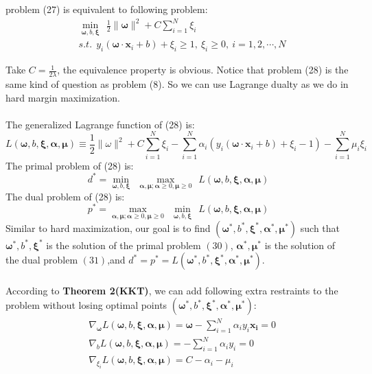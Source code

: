 \begin{theorem}
  problem (27) is equivalent to following problem:
  \begin{equation}
    \begin{split}
      &\min_{\bm\omega,b,\bm\xi}\ \ \frac{1}{2}\|\bm\omega\|^2+C\sum_{i=1}^{N}\xi_{i}\\
      &s.t.\ \ y_{i}(\bm\omega\cdot\bm x_{i}+b)+\xi_{i}\geqslant 1,\ \xi_{i}\geqslant 0,\ i=1,2,\cdots,N
    \end{split}
  \end{equation}
\end{theorem}

\noindent
Take $\displaystyle C=\frac{1}{2\lambda}$, the equivalence property is obvious. Notice that problem (28) is the same kind of question as problem (8). So we can use Lagrange dualty as we do in hard margin maximization.\\
\\
The generalized Lagrange function of (28) is:
\begin{equation}
  L(\bm\omega,b,\bm\xi,\bm\alpha,\bm\mu)\equiv \frac{1}{2}\|\omega\|^2+C\sum_{i=1}^{N}\xi_{i}-\sum_{i=1}^{N}\alpha_{i}(y_{i}(\bm\omega\cdot \bm x_{i}+b)+\xi_{i}-1)-\sum_{i=1}^{N}\mu_{i}\xi_{i}
\end{equation}
The primal problem of (28) is:
\begin{equation}
  d^*=\min_{\bm\omega,b,\bm\xi}\ \ \max_{\bm\alpha,\bm\mu;\bm\alpha\geqslant 0,\bm\mu\geqslant 0}\ \ L(\bm\omega,b,\bm\xi,\bm\alpha,\bm\mu)
\end{equation}
The dual problem of (28) is:
\begin{equation}
  p^*=\max_{\bm\alpha,\bm\mu;\bm\alpha\geqslant 0,\bm\mu\geqslant 0}\ \ \min_{\bm\omega,b,\bm\xi}\ \ L(\bm\omega,b,\bm\xi,\bm\alpha,\bm\mu)
\end{equation}
Similar to hard maximization, our goal is to find $(\bm\omega^*,b^*,\bm\xi^*,\bm\alpha^*,\bm\mu^*)$ such that $\bm\omega^*,b^*,\bm\xi^*$ is the solution of the primal problem $(30)$, $\bm\alpha^*,\bm\mu^*$ is the solution of the dual problem $(31)$,and $d^*=p^*=L(\bm\omega^*,b^*,\bm\xi^*,\bm\alpha^*,\bm\mu^*)$.\\
\\
According to \textbf{Theorem 2(KKT)}, we can add following extra restraints to the problem without losing optimal points $(\bm\omega^*,b^*,\bm\xi^*,\bm\alpha^*,\bm\mu^*)$:
\begin{equation}
  \begin{split}
    &\nabla_{\bm\omega} L(\bm\omega,b,\bm\xi,\bm\alpha,\bm\mu)=\bm\omega-\sum\limits_{i=1}^{N}\alpha_{i}y_{i}\bm{x_{i}}=0\\
    &\nabla_{b} L(\bm\omega,b,\bm\xi,\bm\alpha,\bm\mu)=-\sum\limits_{i=1}^{N}\alpha_{i}y_{i}=0\\
    &\nabla_{\xi_{i}} L(\bm\omega,b,\bm\xi,\bm\alpha,\bm\mu)=C-\alpha_{i}-\mu_{i}
  \end{split}
\end{equation}
